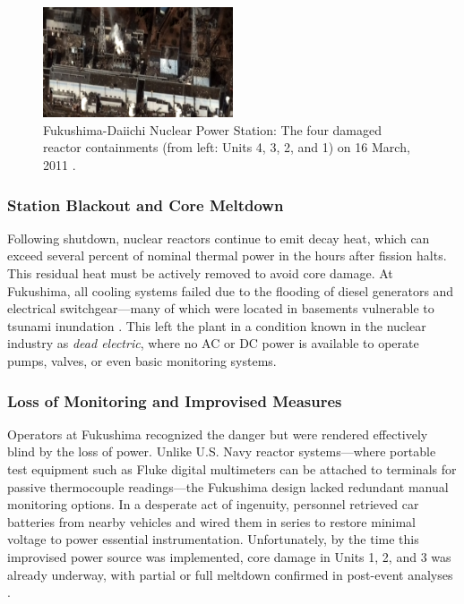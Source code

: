 \documentclass[12pt]{article}
\begin{document}
\begin{figure}[H]
  \centering
  \includegraphics[width=0.5\textwidth]{fukushimaafter.jpg}
  \caption{Fukushima-Daiichi Nuclear Power Station: The four damaged reactor containments (from left: Units 4, 3, 2, and 1) on 16 March, 2011 \autocite{worldnuclear_fukushima_review}.}
  \label{fig:containments}
\end{figure}

\subsubsection{Station Blackout and Core Meltdown}
Following shutdown, nuclear reactors continue to emit decay heat, which can exceed several percent of nominal thermal power in the hours after fission halts. This residual heat must be actively removed to avoid core damage. At Fukushima, all cooling systems failed due to the flooding of diesel generators and electrical switchgear—many of which were located in basements vulnerable to tsunami inundation \autocite{nrc_fukushima}. This left the plant in a condition known in the nuclear industry as \textit{dead electric}, where no AC or DC power is available to operate pumps, valves, or even basic monitoring systems.

\subsubsection{Loss of Monitoring and Improvised Measures}
Operators at Fukushima recognized the danger but were rendered effectively blind by the loss of power. Unlike U.S. Navy reactor systems—where portable test equipment such as Fluke digital multimeters can be attached to terminals for passive thermocouple readings—the Fukushima design lacked redundant manual monitoring options. In a desperate act of ingenuity, personnel retrieved car batteries from nearby vehicles and wired them in series to restore minimal voltage to power essential instrumentation. Unfortunately, by the time this improvised power source was implemented, core damage in Units 1, 2, and 3 was already underway, with partial or full meltdown confirmed in post-event analyses \autocite{worldnuclear_fukushima_review}.
\end{document}
